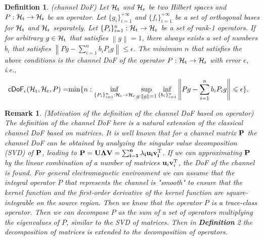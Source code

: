 \documentclass[12pt,draftclsnofoot,journal,onecolumn]{IEEEtran}
\newtheorem{definition}{Definition}
\newtheorem{remark}{Remark}
\begin{document}
\begin{definition}
	\label{def_cDoF}
		(channel DoF) Let $\mathcal{H}_{\rm t}$ and $\mathcal{H}_{\rm r}$ be two Hilbert spaces and $P:\mathcal{H}_{\rm t} \rightarrow \mathcal{H}_{\rm r}$ be an operator. Let $\{g_i\}_{i=1}^{+\infty}$ and $\{f_i\}_{i=1}^{+\infty}$ be a set of orthogonal bases for $\mathcal{H}_{\rm t}$ and $\mathcal{H}_{\rm r}$ separately. Let $\{P_i\}_{i=1}^n: \mathcal{H}_{\rm t} \rightarrow \mathcal{H}_{\rm r}$ be a set of rank-1 operators. 
		If for arbitrary $g \in \mathcal{H}_{\rm t}$ that satisfies $\left\| g \right\|=1$, there always exists a set of numbers $b_i$ that satisfies $\left\| Pg-\sum_{i=1}^{n} b_iP_ig  \right\| \leqslant \epsilon$. The minimum $n$ that satisfies the above conditions is the channel DoF of the operator $P: \mathcal{H}_{\rm t} \rightarrow \mathcal{H}_{\rm r}$ with error $\epsilon$, i.e., 
		\begin{equation}
			\begin{aligned}
			\mathsf{cDoF}_{\epsilon} (\mathcal{H}_{\rm t},\mathcal{H}_{\rm r},P) =& {\rm min}\{ n: \underset{\{P_i\}_{i=1}^n: \mathcal{H}_{\rm t} \rightarrow \mathcal{H}_{\rm r}}{\rm inf} \sup_{g: \left\| g \right\|=1} \inf_{\{b_i\}_{i=1}^n} \left\| Pg-\sum_{i=1}^{n} b_iP_ig  \right\| \leqslant \epsilon  \}.
			\end{aligned}
		\end{equation}
	\end{definition}
	
	\begin{remark}
		(Motivation of the definition of the channel DoF based on operator)
		The definition of the channel DoF here is a natural extension of the classical channel DoF based on matrices. It is well known that for a channel matrix $\bf{P}$ the channel DoF can be obtained by analyzing the singular value decomposition (SVD) of $\bf{P}$, leading to ${\bf P} = {\bf U}\boldsymbol{\Lambda}\bf{V} = \sum_{i=1}^n \lambda_i {\bf u}_i{\bf v}_i^{\rm T}$. 
		If we can approximating ${\bf P}$ by the linear combination of a number of matrices ${\bf u}_i{\bf v}_i^{\rm T}$, the DoF of the channel is found. For general electromagnetic environment we can assume that the integral operator $P$ that represents the channel is "smooth" to ensure that the kernel function and the first-order derivative of the kernel function are square-integrable on the source region. Then we know that the operator $P$ is a trace-class operator\cite{bornemann2010numerical}. Then we can decompose $P$ as the sum of a set of operators multiplying the eigenvalues of $P$, similar to the SVD of matrices. Then in {\bf Definition} 2 the decomposition of matrices is extended to the decomposition of operators.
	\end{remark}
	
\end{document}
